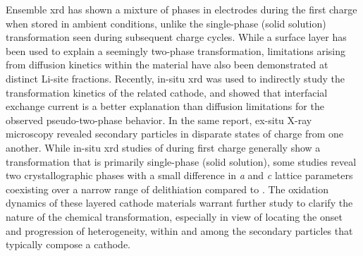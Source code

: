 \documentclass{article}
\begin{document}

Ensemble \gls{xrd} has shown a mixture of phases in \nca{} electrodes
during the first charge when stored in ambient conditions, unlike the
single-phase (solid solution) transformation seen during subsequent
charge cycles\cite{robert2015}. While a  surface layer has
been used to explain a seemingly two-phase
transformation\cite{grenier2017}, limitations arising from diffusion
kinetics within the material have also been demonstrated at distinct
Li-site fractions\cite{chapman2020}. Recently, in-situ \gls{xrd} was
used to indirectly study the transformation kinetics of the related
\nmc[333]{} cathode, and showed that interfacial exchange current is a
better explanation than  diffusion limitations for the
observed pseudo-two-phase behavior\cite{chueh2021}. In the same
report, ex-situ X-ray microscopy revealed secondary particles in
disparate states of charge from one another. While in-situ \gls{xrd}
studies of \nmc[333]{} during first charge generally show a
transformation that is primarily single-phase (solid
solution)\cite{hulzen2018,ahn2017,zhou2016-2}, some studies reveal two
crystallographic phases with a small difference in \emph{a} and
\emph{c} lattice parameters coexisting over a narrow range of
delithiation compared to \nca{}\cite{yoon2006,hua2018}. The oxidation
dynamics of these layered cathode materials warrant further study to
clarify the nature of the chemical transformation, especially in view
of locating the onset and progression of heterogeneity, within and
among the secondary particles that typically compose a cathode.
\end{document}

